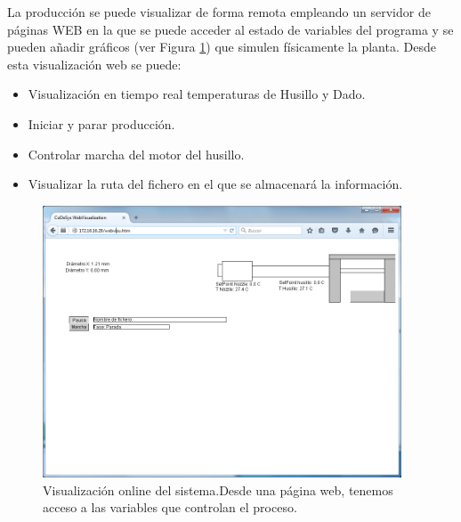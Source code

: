 La producción se puede visualizar de forma remota empleando un servidor de páginas WEB en la que se puede acceder al estado de variables del programa y se pueden añadir gráficos (ver Figura \ref{fig:plc_visu_web}) que simulen físicamente la planta. Desde esta visualización web se puede:

\begin{itemize}
    \item {Visualización en tiempo real temperaturas de Husillo y Dado.}
    \item {Iniciar y parar producción.}
    \item {Controlar marcha del motor del husillo.}
    \item {Visualizar la ruta del fichero en el que se almacenará la información.}
\end{itemize}

\begin{figure}[H]
    \centering
    \includegraphics[width=0.95\textwidth]{images/PLC/visu_online.png}
    \caption[Visualización online del sistema.]{Visualización online del sistema.Desde una página web, tenemos acceso a las variables que controlan el proceso.}
    \label{fig:plc_visu_web}
\end{figure}


